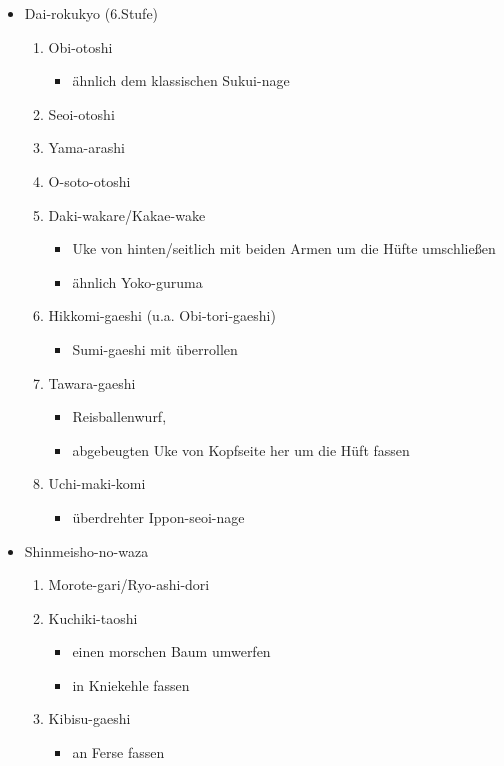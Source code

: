 \documentclass[justified, a4paper, notitlepage, captions=tableheading, nobib]{tufte-handout}
\begin{document}
\begin{itemize}
\item Dai-rokukyo (6.Stufe)
\begin{enumerate}
\item Obi-otoshi
\begin{itemize}
\item ähnlich dem klassischen Sukui-nage
\end{itemize}
\item Seoi-otoshi
\item Yama-arashi
\item O-soto-otoshi
\item Daki-wakare/Kakae-wake
\begin{itemize}
\item Uke von hinten/seitlich mit beiden Armen um die Hüfte umschließen
\item ähnlich Yoko-guruma
\end{itemize}
\item Hikkomi-gaeshi (u.a. Obi-tori-gaeshi)
\begin{itemize}
\item Sumi-gaeshi mit überrollen
\end{itemize}
\item Tawara-gaeshi 
\begin{itemize}
\item Reisballenwurf,
\item abgebeugten Uke von Kopfseite her um die Hüft fassen
\end{itemize}
\item Uchi-maki-komi
\begin{itemize}
\item überdrehter Ippon-seoi-nage
\end{itemize}
\end{enumerate}
\item \label{org7d942f3}Shinmeisho-no-waza
\begin{enumerate}
\item Morote-gari/Ryo-ashi-dori
\item Kuchiki-taoshi
\begin{itemize}
\item einen morschen Baum umwerfen
\item in Kniekehle fassen
\end{itemize}
\item Kibisu-gaeshi
\begin{itemize}
\item an Ferse fassen
\end{itemize}

\end{enumerate}
\end{itemize}
\end{document}
